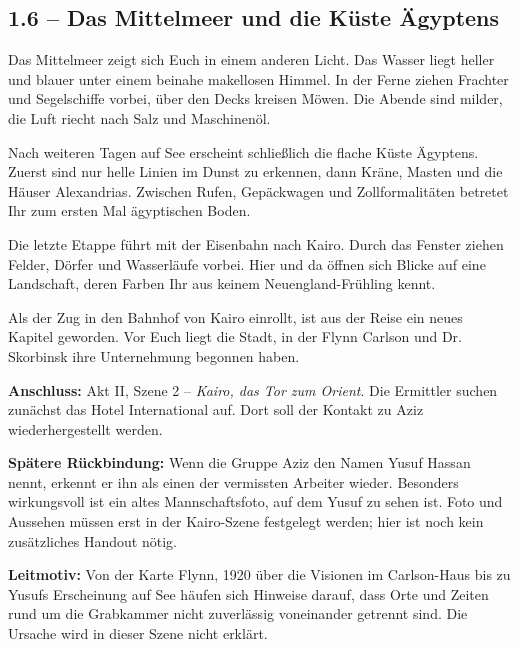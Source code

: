 \subsection{1.6 -- Das Mittelmeer und die Küste Ägyptens}
\begin{vorlesetextalle}
Das Mittelmeer zeigt sich Euch in einem anderen Licht. Das Wasser liegt heller und blauer unter einem beinahe makellosen Himmel. In der Ferne ziehen Frachter und Segelschiffe vorbei, über den Decks kreisen Möwen. Die Abende sind milder, die Luft riecht nach Salz und Maschinenöl.

Nach weiteren Tagen auf See erscheint schlie\ss{}lich die flache Küste Ägyptens. Zuerst sind nur helle Linien im Dunst zu erkennen, dann Kräne, Masten und die Häuser Alexandrias. Zwischen Rufen, Gepäckwagen und Zollformalitäten betretet Ihr zum ersten Mal ägyptischen Boden.

Die letzte Etappe führt mit der Eisenbahn nach Kairo. Durch das Fenster ziehen Felder, Dörfer und Wasserläufe vorbei. Hier und da öffnen sich Blicke auf eine Landschaft, deren Farben Ihr aus keinem Neuengland-Frühling kennt.

Als der Zug in den Bahnhof von Kairo einrollt, ist aus der Reise ein neues Kapitel geworden. Vor Euch liegt die Stadt, in der Flynn Carlson und Dr. Skorbinsk ihre Unternehmung begonnen haben.
\end{vorlesetextalle}
\begin{meisterinfo}
\textbf{Anschluss:} Akt II, Szene 2 -- \emph{Kairo, das Tor zum Orient}. Die Ermittler suchen zunächst das Hotel International auf. Dort soll der Kontakt zu Aziz wiederhergestellt werden.

\textbf{Spätere Rückbindung:} Wenn die Gruppe Aziz den Namen Yusuf Hassan nennt, erkennt er ihn als einen der vermissten Arbeiter wieder. Besonders wirkungsvoll ist ein altes Mannschaftsfoto, auf dem Yusuf zu sehen ist. Foto und Aussehen müssen erst in der Kairo-Szene festgelegt werden; hier ist noch kein zusätzliches Handout nötig.

\textbf{Leitmotiv:} Von der Karte \glqq{}Flynn, 1920\grqq{} über die Visionen im Carlson-Haus bis zu Yusufs Erscheinung auf See häufen sich Hinweise darauf, dass Orte und Zeiten rund um die Grabkammer nicht zuverlässig voneinander getrennt sind. Die Ursache wird in dieser Szene nicht erklärt.
\end{meisterinfo}
